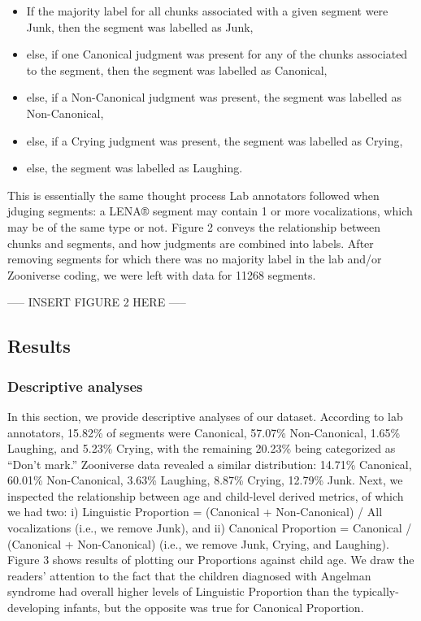 \documentclass[
  english,
  ,man]{apa6}
\providecommand{\tightlist}{%
  \setlength{\itemsep}{0pt}\setlength{\parskip}{0pt}}
\begin{document}
\begin{itemize}
\tightlist
\item
  If the majority label for all chunks associated with a given segment were Junk, then the segment was labelled as Junk,\\
\item
  else, if one Canonical judgment was present for any of the chunks associated to the segment, then the segment was labelled as Canonical,
\item
  else, if a Non-Canonical judgment was present, the segment was labelled as Non-Canonical,
\item
  else, if a Crying judgment was present, the segment was labelled as Crying,
\item
  else, the segment was labelled as Laughing.
\end{itemize}

This is essentially the same thought process Lab annotators followed when jduging segments: a LENA® segment may contain 1 or more vocalizations, which may be of the same type or not. Figure 2 conveys the relationship between chunks and segments, and how judgments are combined into labels. After removing segments for which there was no majority label in the lab and/or Zooniverse coding, we were left with data for 11268 segments.

----- INSERT FIGURE 2 HERE -----

\hypertarget{results}{%
\subsection{Results}\label{results}}

\hypertarget{descriptive-analyses}{%
\subsubsection{Descriptive analyses}\label{descriptive-analyses}}

In this section, we provide descriptive analyses of our dataset. According to lab annotators, 15.82\% of segments were Canonical, 57.07\% Non-Canonical, 1.65\% Laughing, and 5.23\% Crying, with the remaining 20.23\% being categorized as ``Don't mark.'' Zooniverse data revealed a similar distribution: 14.71\% Canonical, 60.01\% Non-Canonical, 3.63\% Laughing, 8.87\% Crying, 12.79\% Junk.
Next, we inspected the relationship between age and child-level derived metrics, of which we had two: i) Linguistic Proportion = (Canonical + Non-Canonical) / All vocalizations (i.e., we remove Junk), and ii) Canonical Proportion = Canonical / (Canonical + Non-Canonical) (i.e., we remove Junk, Crying, and Laughing). Figure 3 shows results of plotting our Proportions against child age. We draw the readers' attention to the fact that the children diagnosed with Angelman syndrome had overall higher levels of Linguistic Proportion than the typically-developing infants, but the opposite was true for Canonical Proportion.
\end{document}
